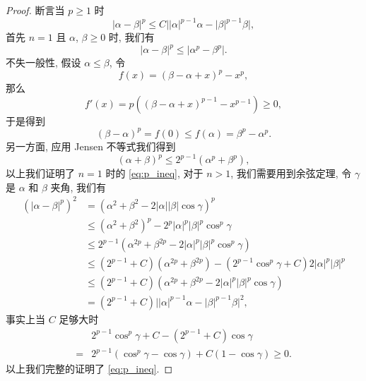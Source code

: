 \documentclass[oneside,longtitle]{LZUthesis}
\theoremstyle{definition}
\numberwithin{equation}{chapter}
\newcommand*\abs[1]{\lvert#1\rvert}
\begin{document}
\begin{proof}
	断言当 $p \geq 1 $ 时
	\begin{equation}\label{eq:p_ineq}
		\abs{\alpha-\beta}^p \leq C\abs{\abs{\alpha}^{p-1}\alpha - \abs{\beta}^{p-1}\beta},
	\end{equation}
	首先 $n = 1$ 且 $\alpha$, $\beta \geq 0$ 时, 我们有
	\begin{equation}
		\abs{\alpha-\beta}^p \leq \abs{\alpha^p - \beta^p}.
	\end{equation}
	不失一般性, 假设 $\alpha \leq \beta$, 令
	\begin{equation}
		f(x) = (\beta-\alpha+x)^p - x^p,
	\end{equation}
	那么
	\begin{equation}
		f'(x) = p\left((\beta-\alpha+x)^{p-1} - x^{p-1}\right) \geq 0,
	\end{equation}
	于是得到
	\begin{equation}
		\left(\beta-\alpha\right)^p = f(0) \leq f(\alpha) = \beta^p - \alpha^p.
	\end{equation}
	另一方面, 应用 Jensen 不等式我们得到
	\begin{equation}
		\left(\alpha+\beta\right)^p \leq 2^{p-1}\left(\alpha^p + \beta^p\right),
	\end{equation}
	以上我们证明了 $n = 1$ 时的 \cref{eq:p_ineq},
	对于 $n > 1$, 我们需要用到余弦定理, 令 $\gamma$ 是 $\alpha$ 和 $\beta$ 夹角, 我们有
	\begin{equation}
		\begin{split}
			\left(\abs{\alpha-\beta}^p\right)^2
			&= \left(\alpha^2 + \beta^2 - 2 \abs{\alpha}\abs{\beta}\cos{\gamma}\right)^p\\
			&\leq \left(\alpha^2+\beta^2\right)^p - 2^p\abs{\alpha}^p\abs{\beta}^p\cos^p{\gamma}\\
			&\leq 2^{p-1}\left(\alpha^{2p} + \beta^{2p} - 2\abs{\alpha}^p\abs{\beta}^p\cos^p{\gamma}\right)\\
			&\leq \left(2^{p-1}+C\right)\left(\alpha^{2p} + \beta^{2p}\right)
			- \left(2^{p-1}\cos^p{\gamma}+C\right)2\abs{\alpha}^p\abs{\beta}^p\\
			&\leq \left(2^{p-1}+C\right)\left(\alpha^{2p} + \beta^{2p} - 2\abs{\alpha}^p\abs{\beta}^p\cos{\gamma}\right)\\
			&= \left(2^{p-1}+C\right)\abs{\abs{\alpha}^{p-1}\alpha - \abs{\beta}^{p-1}\beta}^2,
		\end{split}
	\end{equation}
	事实上当 $C$ 足够大时
	\begin{equation}
		\begin{split}
			& 2^{p-1}\cos^p{\gamma} + C - \left(2^{p-1}+C\right)\cos{\gamma}\\
			={} & 2^{p-1}\left(\cos^p{\gamma} - \cos{\gamma}\right) + C\left(1-\cos{\gamma}\right)
			\geq 0.
		\end{split}
	\end{equation}
	以上我们完整的证明了 \cref{eq:p_ineq}.


\end{proof}
\end{document}
